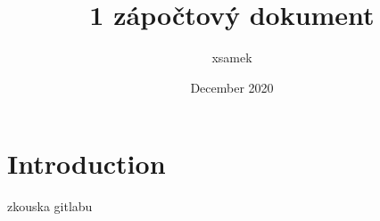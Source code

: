 \documentclass{article}
\title{1 zápočtový dokument}
\author{xsamek }
\date{December 2020}
\begin{document}
\maketitle

\section{Introduction}
zkouska gitlabu
\end{document}
